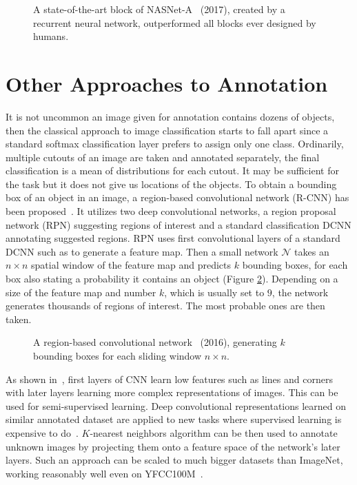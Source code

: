 \begin{figure}
	\centering
	
	
	\caption[A state-of-the-art block of NASNet-A]{A state-of-the-art block of NASNet-A~\cite{zoph2017learning} (2017), created by a recurrent neural network, outperformed all blocks ever designed by humans.}
	\label{fig:nasnet_block}
\end{figure}

\section{Other Approaches to Annotation}

It is not uncommon an image given for annotation contains dozens of objects, then the classical approach to image classification starts to fall apart since a standard softmax classification layer prefers to assign only one class. Ordinarily, multiple cutouts of an image are taken and annotated separately, the final classification is a mean of distributions for each cutout. It may be sufficient for the task but it does not give us locations of the objects. To obtain a bounding box of an object in an image, a region-based convolutional network (R-CNN) has been proposed~\cite{ren2015faster}. It utilizes two deep convolutional networks, a region proposal network (RPN) suggesting regions of interest and a standard classification DCNN annotating suggested regions. RPN uses first convolutional layers of a standard DCNN such as \cite{simonyan2014very} to generate a feature map. Then a small network $\mathcal{N}$ takes an $n\times n$ spatial window of the feature map and predicts $k$ bounding boxes, for each box also stating a probability it contains an object (Figure \ref{fig:faster_RCNN}). Depending on a size of the feature map and number $k$, which is usually set to $9$, the network generates thousands of regions of interest. The most probable ones are then taken.


\begin{figure}
	\centering
	
	
	\caption[A region-based convolutional network]{A region-based convolutional network~\cite{ren2015faster} (2016), generating $k$ bounding boxes for each sliding window $n\times n$.}
	\label{fig:faster_RCNN}
\end{figure}

As shown in~\cite{zeiler2014visualizing}, first layers of CNN learn low features such as lines and corners with later layers learning more complex representations of images. This can be used for semi-supervised learning. Deep convolutional representations learned on similar annotated dataset are applied to new tasks where supervised learning is expensive to do~\cite{donahue2014decaf}. $K$-nearest neighbors algorithm can be then used to annotate unknown images by projecting them onto a feature space of the network's later layers. Such an approach can be scaled to much bigger datasets than ImageNet, working reasonably well even on YFCC100M~\cite{amato2017searching}.